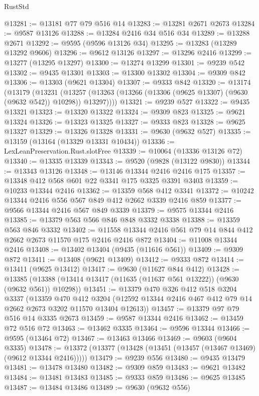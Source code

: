 \begin{lexlean}{RustStd}
\begin{coremodule}
@13281 := @13181 @77 @79 @516 @14
@13283 := @13281 @2671 @2673
@13284 := @9587 @13126
@13288 := @13284 @2416 @34 @516 @34
@13289 := @13288 @2671
@13292 := @9595 (@9596 @13126 @34)
@13295 := @13283 (@13289 @13292 @9606)
@13296 := @9612 @13126
@13297 := @13296 @2416
@13299 := @13277 (@13295 @13297)
@13300 := @13274 @13299
@13301 := @9239 @542
@13302 := @9435 @13301
@13303 := @13300 @13302
@13304 := @9309 @842
@13306 := @13303 (@9621 @13304)
@13307 := @9333 @842
@13320 := @13174
    (@13179
      (@13231
        (@13257 (@13263 (@13266 (@13306 (@9625 @13307) (@9630 (@9632 @542)) @10298)) @13297))))
@13321 := @9239 @527
@13322 := @9435 @13321
@13323 := @13320 @13322
@13324 := @9309 @823
@13325 := @9621 @13324
@13326 := @13323 @13325
@13327 := @9333 @823
@13328 := @9625 @13327
@13329 := @13326 @13328
@13331 := @9630 (@9632 @527)
@13335 := @13159 (@13164 (@13329 @13331 @10434))
@13336 := LexLeanPreservation.Rust.slotFree
@13339 := @10064 (@13336 @13126 @72)
@13340 := @13335 @13339
@13343 := @9520 (@9828 (@13122 @9830))
@13344 := @13343 @13126
@13348 := @13146 @13344 @2416 @2416 @175
@13357 := @13348 @412 @568 @601 @22 @3341 @175 @3325 @3391 @3403
@13359 := @10233 @13344 @2416
@13362 := @13359 @568 @412 @3341
@13372 := @10242 @13344 @2416 @556 @567 @849 @412 @2662 @3339 @2416 @859
@13377 := @9566 @13344 @2416 @567 @849 @3339
@13379 := @9575 @13344 @2416
@13385 := @13379 @563 @566 @846 @848 @3332 @3338
@13388 := @13359 @563 @846 @3332
@13402 := @11558 @13344 @2416 @561 @79 @14 @844 @412 @2662 @2673 @11570 @175 @2416 @2416 @872
@13404 := @11008 @13344 @2416
@13408 := @13402 @13404 (@9435 (@11616 @561))
@13409 := @9309 @872
@13411 := @13408 (@9621 @13409)
@13412 := @9333 @872
@13414 := @13411 (@9625 @13412)
@13417 := @9630 (@11627 @844 @412)
@13428 := @13385 (@13388 (@13414 @13417 (@11635 (@11637 @561 @13222)) (@9630 (@9632 @561)) @10298))
@13451 := @13379
    @470
    @326
    @412
    @518
    @3204
    @3337
    (@13359
      @470
      @412
      @3204
      (@12592 @13344 @2416 @467 @412 @79 @14 @2662 @2673 @3202 @11570 @13404 @12613))
@13457 := @13379 @97 @79 @516 @14 @3335 @2673
@13459 := @9587 @13344 @2416
@13462 := @13459 @72 @516 @72
@13463 := @13462 @3335
@13464 := @9596 @13344
@13466 := @9595 (@13464 @72)
@13467 := @13463 @13466
@13469 := @9603 (@9604 @3335)
@13478 := @13372 (@13377 (@13428 (@13451 (@13457 (@13467 @13469) (@9612 @13344 @2416)))))
@13479 := @9239 @556
@13480 := @9435 @13479
@13481 := @13478 @13480
@13482 := @9309 @859
@13483 := @9621 @13482
@13484 := @13481 @13483
@13485 := @9333 @859
@13486 := @9625 @13485
@13487 := @13484 @13486
@13489 := @9630 (@9632 @556)

\end{coremodule}
\end{lexlean}
